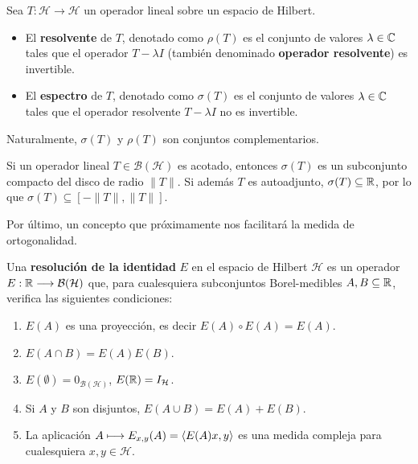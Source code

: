     \begin{definicion}
        Sea $T:\mathcal H \longrightarrow \mathcal{H}$ un operador lineal sobre un espacio de Hilbert. 
        \begin{itemize}
            \item El \textbf{resolvente} de $T$, denotado como $\rho(T)$ es el conjunto de valores $\lambda\in\mathbb{C}$ tales que el operador $T-\lambda I$ (también denominado \textbf{operador resolvente}) es invertible.
            \item El \textbf{espectro} de $T$, denotado como $\sigma(T)$ es el conjunto de valores $\lambda\in\mathbb{C}$ tales que el operador resolvente $T-\lambda I$ no es invertible.
        \end{itemize}
        Naturalmente, $\sigma(T)$ y $\rho(T)$ son conjuntos complementarios.
    \end{definicion}

    Si un operador lineal $T\in\mathcal{B}(\mathcal{H})$ es acotado, entonces $\sigma(T)$ es un subconjunto compacto del disco de radio $\|T\|$. Si además $T$ es autoadjunto, $\sigma(T)\subseteq\mathbb{R}$, por lo que $\sigma(T)\subseteq[-\|T\|,\|T\|]$.

    Por último, un concepto que próximamente nos facilitará la medida de ortogonalidad.
    
    \begin{definicion}
        \label{def:resolucion-identidad}
        Una \textbf{resolución de la identidad} $E$ en el espacio de Hilbert $\mathcal{H}$ es un operador $E:\mathbb{R}\longrightarrow\mathcal{B}(\mathcal{H})$ que, para cualesquiera subconjuntos Borel-medibles $A,B\subseteq \mathbb{R}$, verifica las siguientes condiciones:
        \begin{enumerate}
            \item $E(A)$ es una proyección, es decir $E(A)\circ E(A)=E(A)$.
            \item $E(A\cap B)=E(A)E(B)$.
            \item $E(\emptyset)=0_{\mathcal{B}(\mathcal{H})}$, $E(\mathbb{R})=I_\mathcal{H}$.
            \item Si $A$ y $B$ son disjuntos, $E(A\cup B)=E(A)+E(B)$.
            \item La aplicación $A\longmapsto E_{x,y}(A)=\left\langle E(A)x , y \right\rangle$ es una medida compleja para cualesquiera $x,y\in\mathcal{H}$.
        \end{enumerate}
    \end{definicion}

